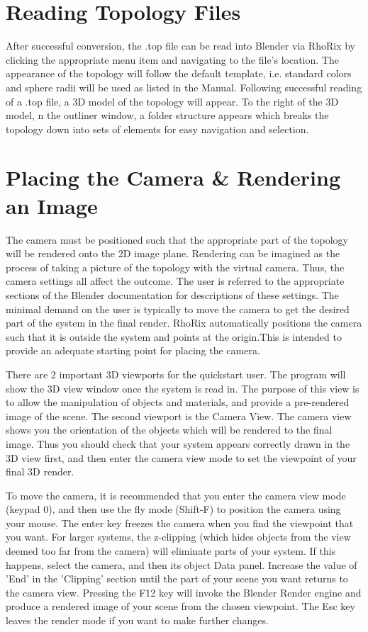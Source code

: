 \documentclass{tufte-handout}
\newcommand{\programName}{RhoRix}
\newcommand{\operatorPath}{File $\rightarrow$ Import $\rightarrow$ Quantum Chemical Topology (.top)}
\newcommand{\enterCamera}{keypad $0$}
\newcommand{\flyMode}{Shift-F}
\newcommand{\renderKey}{F12}
\newcommand{\leaveRender}{Esc}
\begin{document}
\section{Reading Topology Files}
After successful conversion, the .top file can be read into Blender via \programName{} by clicking the appropriate menu item\sidenote{\operatorPath{}} and navigating to the file's location.
The appearance of the topology will follow the default template, i.e. standard colors and sphere radii will be used as listed in the Manual.
Following successful reading of a .top file, a 3D model of the topology will appear. To the right of the 3D model, n the outliner window, a folder structure appears which breaks the topology down into sets of elements for easy navigation and selection.

\section{Placing the Camera \& Rendering an Image}
The camera must be positioned such that the appropriate part of the topology will be rendered onto the 2D image plane.
Rendering can be imagined as the process of taking a picture of the topology with the virtual camera. 
Thus, the camera settings all affect the outcome. 
The user is referred to the appropriate sections of the Blender documentation for descriptions of these settings.
The minimal demand on the user is typically to move the camera to get the desired part of the system in the final 
render.
\programName{} automatically positions the camera such that it is outside the system and points at the origin.This is intended to provide an adequate starting point for placing the camera.
\par{}
There are 2 important 3D viewports for the quickstart user. The program will show the 3D view window once the 
system is read in.
The purpose of this view is to allow the manipulation of objects and materials, and provide a pre-rendered image 
of the scene.
The second viewport is the Camera View. The camera view shows you the orientation of the objects which will be rendered to the final image.
Thus you should check that your system appears correctly drawn in the 3D view first, and then enter the camera 
view mode to set the viewpoint of your final 3D render.
\par{}
To move the camera, it is recommended that you enter the camera view mode (\enterCamera{}), and then use the fly mode (\flyMode{}) to position the camera using your mouse.
The enter key freezes the camera when you find the viewpoint that you want.
For larger systems, the z-clipping (which hides objects from the view deemed too far from the camera) will 
eliminate parts of your system.
If this happens, select the camera, and then its object Data panel.
Increase the value of 'End' in the 'Clipping' section until the part of your scene you want returns to the camera view.
Pressing the \renderKey{} key will invoke the Blender Render engine and produce a rendered image of your scene from the chosen viewpoint.
The \leaveRender{} key leaves the render mode if you want to make further changes.
\end{document}
